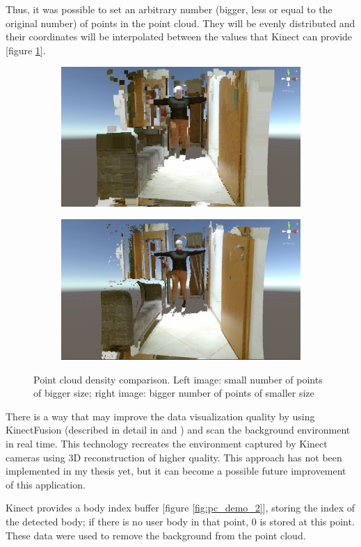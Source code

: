 \documentclass[a4paper]{report}
\begin{document}
Thus, it was possible to set an arbitrary number (bigger, less or equal to the original number) of points in the point cloud. They will be evenly distributed and their coordinates will be interpolated between the values that Kinect can provide [figure \ref{fig:pc_demo_3}].


\begin{figure}[H]
\centering
\begin{subfigure}{\textwidth}
  \centering
  \includegraphics[width=.45\textwidth , keepaspectratio]{images/pointCloud/Screenshot 2021-05-14 211444_.png}
\end{subfigure}%
\begin{subfigure}{\textwidth}
  \centering
\includegraphics[width=.45\textwidth , keepaspectratio]{images/pointCloud/Screenshot 2021-05-14 211519.png}
\end{subfigure}
\caption{Point cloud density comparison. Left image: small number of points of bigger size; right image: bigger number of points of smaller size}
\label{fig:pc_demo_3}
\end{figure}

 
There is a way that may improve the data visualization quality by using KinectFusion (described in detail in \cite{ARpp} and \cite{IndoorKinect}) and scan the background environment in real time. This technology recreates the environment captured by Kinect cameras using 3D reconstruction of higher quality. This approach has not been implemented in my thesis yet, but it can become a possible future improvement of this application. 




 \bigskip Kinect provides a body index buffer [figure \ref{fig:pc_demo_2}], storing the index of the detected body; if there is no user body in that point, 0 is stored at this point. These data were used to remove the background from the point cloud.
\end{document}
